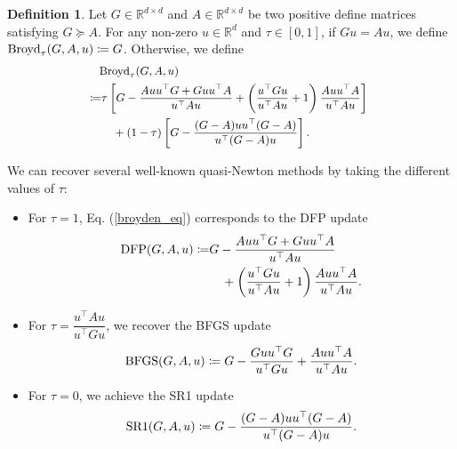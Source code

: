 \documentclass[letterpaper]{article} %
\theoremstyle{plain}
\theoremstyle{definition}
\newtheorem{definition}[theorem]{Definition}
\theoremstyle{remark}
\def\BR{{\mathbb{R}}}
\begin{document}
\begin{definition}
    Let $G\in\BR^{d \times d}$ and $A\in\BR^{d \times d}$ be two positive define matrices satisfying $G \succeq A$. For any non-zero $u \in \BR^d$ and $\tau\in[0,1]$, if $G u = A u$, we define 
    ${\rm Broyd}_{\tau}(G, A, u) \coloneqq G$. Otherwise, we define
    \begin{equation}
    \small
    \begin{split}
        \!& \!{\rm Broyd}_{\tau}(G, A, u) \\ 
        \!\!\coloneqq & \tau \left[ G - \frac{A u u^{\top}G + G u u^{\top} A}{u^{\top} A u} + \left( \frac{u^{\top} G u}{u^{\top} A u} + 1\right) \frac{A u u^{\top} A}{u^{\top} A u} \right] \\
        & \quad + (1 - \tau) \left[ G - \frac{(G - A) u u^{\top} (G - A)}{u^{\top} (G - A) u}\right].
    \end{split}
    \label{broyden_eq}
    \end{equation}
\end{definition}

We can recover several well-known quasi-Newton methods by taking the different values of $\tau$:
\begin{itemize}
\item  For $\tau = 1$, Eq. (\ref{broyden_eq}) corresponds to the DFP update
\begin{equation*}
\begin{split}
    {\rm DFP}(G, A, u) \coloneqq & G - \frac{A u u^{\top} G + G u u^{\top} A}{u^{\top} A u}  \\
    & \quad + \left( \frac{u^{\top} G u}{u^{\top} A u} + 1 \right) \frac{A u u^{\top} A}{u^{\top} A u}.
\end{split}
\end{equation*}
\item For $\tau = \dfrac{u^{\top} A u}{u^{\top} G u}$, we recover the BFGS update
\begin{equation*}
    {\rm BFGS}(G, A, u) \coloneqq G - \frac{G u u^{\top} G}{u^{\top} G u} + \frac{A u u^{\top} A}{u^{\top} A u}.
\end{equation*}
\item For $\tau=0$, we achieve the SR1 update
\begin{equation}
    {\rm SR1}(G, A, u) \coloneqq G - \frac{(G - A) u u^{\top} (G - A)}{u^{\top} (G - A) u}.
    \label{sr1_def}
\end{equation}
\end{itemize}
\end{document}
